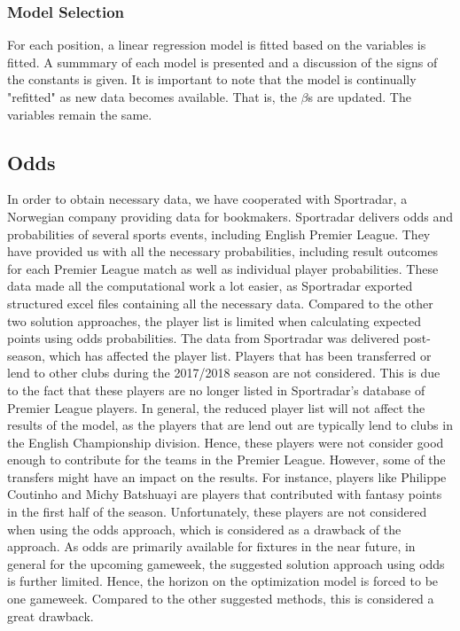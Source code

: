 \subsubsection{Model Selection}

For each position, a linear regression model is fitted based on the variables is fitted. A summmary of each model is presented and a discussion of the signs of the constants is given. It is important to note that the model is continually "refitted" as new data becomes available. That is, the $\beta $s are updated. The variables remain the same.


\subsection{Odds}
In order to obtain necessary data, we have cooperated with Sportradar, a Norwegian company providing data for bookmakers. Sportradar delivers odds and probabilities of several sports events, including English Premier League. They have provided us with all the necessary probabilities, including result outcomes for each Premier League match as well as individual player probabilities. These data made all the computational work a lot easier, as Sportradar exported structured excel files containing all the necessary data. 
\newpar
Compared to the other two solution approaches, the player list is limited when calculating expected points using odds probabilities. The data from Sportradar was delivered post-season, which has affected the player list. Players that has been transferred or lend to other clubs during the 2017/2018 season are not considered. This is due to the fact that these players are no longer listed in Sportradar's database of Premier League players. In general, the reduced player list will not affect the results of the model, as the players that are lend out are typically lend to clubs in the English Championship division. Hence, these players were not consider good enough to contribute for the teams in the Premier League. However, some of the transfers might have an impact on the results. For instance, players like Philippe Coutinho and Michy Batshuayi are players that contributed with fantasy points in the first half of the season. Unfortunately, these players are not considered when using the odds approach, which is considered as a drawback of the approach.  
\newpar
As odds are primarily available for fixtures in the near future, in general for the upcoming gameweek, the suggested solution approach using odds is further limited. Hence, the horizon on the optimization model is forced to be one gameweek. Compared to the other suggested methods, this is considered a great drawback.


